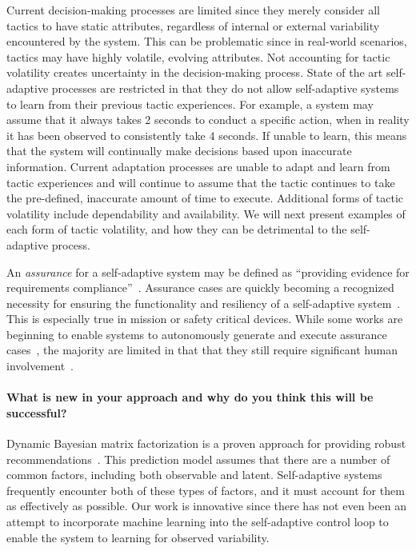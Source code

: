 \documentclass[12pt]{article}
\begin{document}
Current decision-making processes are limited since they merely consider all tactics to have static attributes, regardless of internal or external variability encountered by the system. This can be problematic since in real-world scenarios, tactics may have highly volatile, evolving attributes. Not accounting for tactic volatility creates uncertainty in the decision-making process. State of the art self-adaptive processes are restricted in that they do not allow self-adaptive systems to learn from their previous tactic experiences. For example, a system may assume that it always takes 2 seconds to conduct a specific action, when in reality it has been observed to consistently take 4 seconds. If unable to learn, this means that the system will continually make decisions based upon inaccurate information. Current adaptation processes are unable to adapt and learn from tactic experiences and will continue to assume that the tactic continues to take the pre-defined, inaccurate amount of time to execute. Additional forms of tactic volatility include dependability and availability. We will next present examples of each form of tactic volatility, and how they can be detrimental to the self-adaptive process.



An \emph{assurance} for a self-adaptive system may be defined as ``providing evidence for requirements compliance''~\cite{weyns2017perpetual}. Assurance cases are quickly becoming a recognized necessity for ensuring the functionality and resiliency of a self-adaptive system~\cite{schmerl2017challenges, de2017software}. This is especially true in mission or safety critical devices. While some works are beginning to enable systems to autonomously generate and execute assurance cases~\cite{denney2017tool}, the majority are limited in that that they still require significant human involvement~\cite{weyns2017perpetual}.


\vspace{-5mm}\paragraph{What is new in your approach and why do you think this will be successful?}

Dynamic Bayesian matrix factorization is a proven approach for providing robust recommendations~\cite{sun2012dynamic}. This prediction model assumes that there are a number of common factors, including both observable and latent. Self-adaptive systems frequently encounter both of these types of factors, and it must account for them as effectively as possible. Our work is innovative since there has not even been an attempt to incorporate machine learning into the self-adaptive control loop to enable the system to learning for observed variability. 
\end{document}

